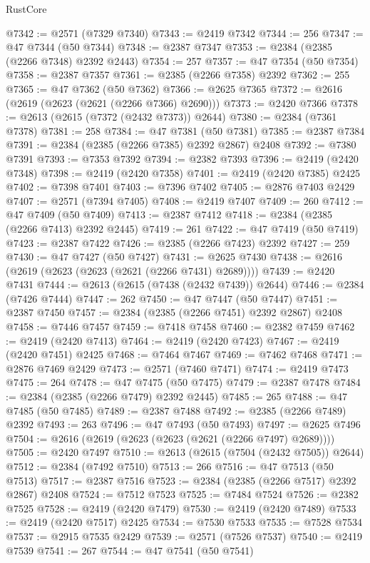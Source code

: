 \begin{lexlean}{RustCore}
\begin{coremodule}
@7342 := @2571 (@7329 @7340)
@7343 := @2419 @7342
@7344 := 256
@7347 := @47 @7344 (@50 @7344)
@7348 := @2387 @7347
@7353 := @2384 (@2385 (@2266 @7348) @2392 @2443)
@7354 := 257
@7357 := @47 @7354 (@50 @7354)
@7358 := @2387 @7357
@7361 := @2385 (@2266 @7358) @2392
@7362 := 255
@7365 := @47 @7362 (@50 @7362)
@7366 := @2625 @7365
@7372 := @2616 (@2619 (@2623 (@2621 (@2266 @7366) @2690)))
@7373 := @2420 @7366
@7378 := @2613 (@2615 (@7372 (@2432 @7373)) @2644)
@7380 := @2384 (@7361 @7378)
@7381 := 258
@7384 := @47 @7381 (@50 @7381)
@7385 := @2387 @7384
@7391 := @2384 (@2385 (@2266 @7385) @2392 @2867) @2408
@7392 := @7380 @7391
@7393 := @7353 @7392
@7394 := @2382 @7393
@7396 := @2419 (@2420 @7348)
@7398 := @2419 (@2420 @7358)
@7401 := @2419 (@2420 @7385) @2425
@7402 := @7398 @7401
@7403 := @7396 @7402
@7405 := @2876 @7403 @2429
@7407 := @2571 (@7394 @7405)
@7408 := @2419 @7407
@7409 := 260
@7412 := @47 @7409 (@50 @7409)
@7413 := @2387 @7412
@7418 := @2384 (@2385 (@2266 @7413) @2392 @2445)
@7419 := 261
@7422 := @47 @7419 (@50 @7419)
@7423 := @2387 @7422
@7426 := @2385 (@2266 @7423) @2392
@7427 := 259
@7430 := @47 @7427 (@50 @7427)
@7431 := @2625 @7430
@7438 := @2616 (@2619 (@2623 (@2623 (@2621 (@2266 @7431) @2689))))
@7439 := @2420 @7431
@7444 := @2613 (@2615 (@7438 (@2432 @7439)) @2644)
@7446 := @2384 (@7426 @7444)
@7447 := 262
@7450 := @47 @7447 (@50 @7447)
@7451 := @2387 @7450
@7457 := @2384 (@2385 (@2266 @7451) @2392 @2867) @2408
@7458 := @7446 @7457
@7459 := @7418 @7458
@7460 := @2382 @7459
@7462 := @2419 (@2420 @7413)
@7464 := @2419 (@2420 @7423)
@7467 := @2419 (@2420 @7451) @2425
@7468 := @7464 @7467
@7469 := @7462 @7468
@7471 := @2876 @7469 @2429
@7473 := @2571 (@7460 @7471)
@7474 := @2419 @7473
@7475 := 264
@7478 := @47 @7475 (@50 @7475)
@7479 := @2387 @7478
@7484 := @2384 (@2385 (@2266 @7479) @2392 @2445)
@7485 := 265
@7488 := @47 @7485 (@50 @7485)
@7489 := @2387 @7488
@7492 := @2385 (@2266 @7489) @2392
@7493 := 263
@7496 := @47 @7493 (@50 @7493)
@7497 := @2625 @7496
@7504 := @2616 (@2619 (@2623 (@2623 (@2621 (@2266 @7497) @2689))))
@7505 := @2420 @7497
@7510 := @2613 (@2615 (@7504 (@2432 @7505)) @2644)
@7512 := @2384 (@7492 @7510)
@7513 := 266
@7516 := @47 @7513 (@50 @7513)
@7517 := @2387 @7516
@7523 := @2384 (@2385 (@2266 @7517) @2392 @2867) @2408
@7524 := @7512 @7523
@7525 := @7484 @7524
@7526 := @2382 @7525
@7528 := @2419 (@2420 @7479)
@7530 := @2419 (@2420 @7489)
@7533 := @2419 (@2420 @7517) @2425
@7534 := @7530 @7533
@7535 := @7528 @7534
@7537 := @2915 @7535 @2429
@7539 := @2571 (@7526 @7537)
@7540 := @2419 @7539
@7541 := 267
@7544 := @47 @7541 (@50 @7541)

\end{coremodule}
\end{lexlean}

